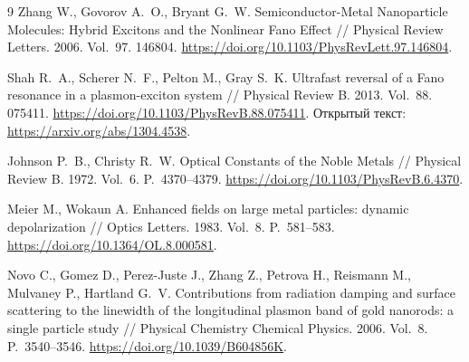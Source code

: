 \renewcommand{\refname}{Список литературы}
\begin{thebibliography}{9}
 Zhang W., Govorov A.~O., Bryant G.~W.
Semiconductor-Metal Nanoparticle Molecules: Hybrid Excitons and the
Nonlinear Fano Effect // Physical Review Letters. 2006. Vol.~97. 146804.
\url{https://doi.org/10.1103/PhysRevLett.97.146804}.

 Shah R.~A., Scherer N.~F., Pelton M., Gray S.~K.
Ultrafast reversal of a Fano resonance in a plasmon-exciton system
// Physical Review B. 2013. Vol.~88. 075411.
\url{https://doi.org/10.1103/PhysRevB.88.075411}.
Открытый текст: \url{https://arxiv.org/abs/1304.4538}.

 Johnson P.~B., Christy R.~W.
Optical Constants of the Noble Metals // Physical Review B.
1972. Vol.~6. P.~4370--4379.
\url{https://doi.org/10.1103/PhysRevB.6.4370}.

 Meier M., Wokaun A.
Enhanced fields on large metal particles: dynamic depolarization
// Optics Letters. 1983. Vol.~8. P.~581--583.
\url{https://doi.org/10.1364/OL.8.000581}.

 Novo C., Gomez D., Perez-Juste J., Zhang Z.,
Petrova H., Reismann M., Mulvaney P., Hartland G.~V.
Contributions from radiation damping and surface scattering to the
linewidth of the longitudinal plasmon band of gold nanorods:
a single particle study // Physical Chemistry Chemical Physics.
2006. Vol.~8. P.~3540--3546.
\url{https://doi.org/10.1039/B604856K}.
\end{thebibliography}
